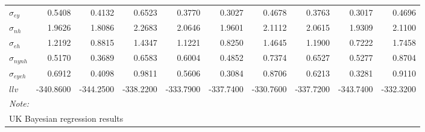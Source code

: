 \documentclass[
  12pt,
]{article}
\begin{document}
\begin{table}
{\begin{tabular}[t]{lrrr>{}r>{}r>{}rrrr}
$\sigma_{ey}$ & 0.5408 & 0.4132 & 0.6523 & 0.3770 & 0.3027 & 0.4678 & 0.3763 & 0.3017 & 0.4696\\
$\sigma_{nh}$ & 1.9626 & 1.8086 & 2.2683 & 2.0646 & 1.9601 & 2.1112 & 2.0615 & 1.9309 & 2.1100\\
$\sigma_{eh}$ & 1.2192 & 0.8815 & 1.4347 & 1.1221 & 0.8250 & 1.4645 & 1.1900 & 0.7222 & 1.7458\\
\addlinespace
$\sigma_{nynh}$ & 0.5170 & 0.3689 & 0.6583 & 0.6004 & 0.4852 & 0.7374 & 0.6527 & 0.5277 & 0.8704\\
$\sigma_{eyeh}$ & 0.6912 & 0.4098 & 0.9811 & 0.5606 & 0.3084 & 0.8706 & 0.6213 & 0.3281 & 0.9110\\
$llv$ & -340.8600 & -344.2500 & -338.2200 & -333.7900 & -337.7400 & -330.7600 & -337.7200 & -343.7400 & -332.3200\\
\bottomrule
\multicolumn{10}{l}{\rule{0pt}{1em}\textit{Note: }}\\
\multicolumn{10}{l}{\rule{0pt}{1em}UK Bayesian regression results}\\
\end{tabular}}
\end{table}

\clearpage
\end{document}
